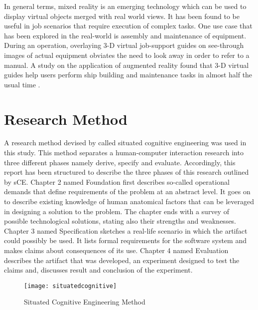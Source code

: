 
In general terms, mixed reality is an emerging technology which can be used to display virtual objects merged with real world views. It has been found to be useful in job scenarios that require execution of complex tasks. One use case that has been explored in the real-world is assembly and maintenance of equipment. During an operation, overlaying 3-D virtual job-support guides on see-through images of actual equipment obviates the need to look away in order to refer to a manual. A study on the application of augmented reality found that 3-D virtual guides help users perform ship building and maintenance tasks in almost half the usual time \parencite{henderson2011exploring}.



\section{Research Method}
A research method devised by \cite{neerincx2008situated} called situated cognitive engineering was used in this study. This method separates a human-computer interaction research into three different phases namely derive, specify and evaluate. Accordingly, this report has been structured to describe the three phases of this research outlined by sCE. Chapter 2 named Foundation first describes so-called operational demands that define requirements of the problem at an abstract level. It goes on to describe existing knowledge of human anatomical factors that can be leveraged in designing a solution to the problem. The chapter ends with a survey of possible technological solutions, stating also their strengths and weaknesses. Chapter 3 named Specification sketches a real-life scenario in which the artifact could possibly be used. It lists formal requirements for the software system and makes claims about consequences of its use. Chapter 4 named Evaluation describes the artifact that was developed, an experiment designed to test the claims and, discusses result and conclusion of the experiment. 

\begin{figure}
	\centering
	\texttt{[image: situatedcognitive]}
	\caption{Situated Cognitive Engineering Method \parencite{neerincx2008situated}}
	\label{fig:augreal}
\end{figure}
